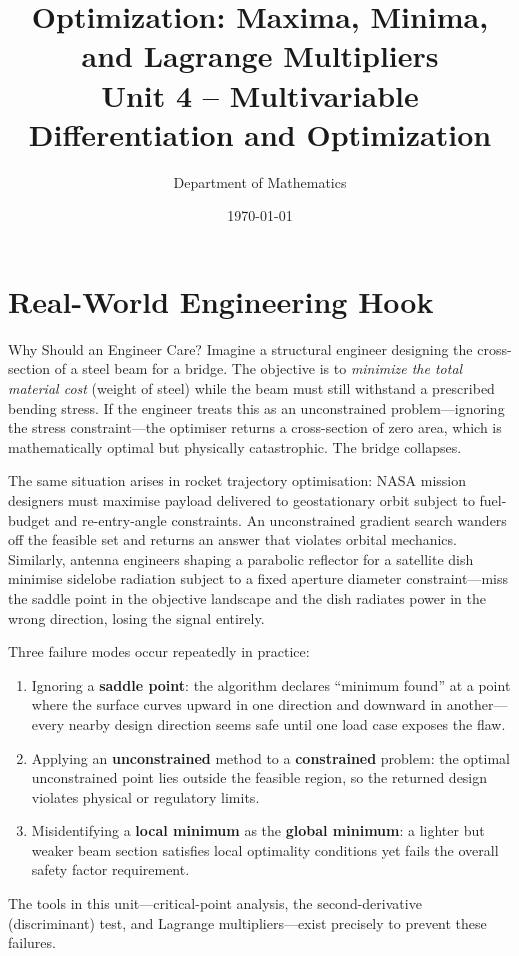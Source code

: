 \documentclass[12pt,a4paper]{article}
\title{\textbf{Optimization: Maxima, Minima, and Lagrange Multipliers} \\ \large Unit 4 -- Multivariable Differentiation and Optimization}
\author{Department of Mathematics}
\date{\today}
\begin{document}
\maketitle
\tableofcontents
\newpage

\section{Real-World Engineering Hook}

\begin{curiositybox}{Why Should an Engineer Care?}
Imagine a structural engineer designing the cross-section of a steel beam for a bridge. The objective is to \emph{minimize the total material cost} (weight of steel) while the beam must still withstand a prescribed bending stress. If the engineer treats this as an unconstrained problem---ignoring the stress constraint---the optimiser returns a cross-section of zero area, which is mathematically optimal but physically catastrophic. The bridge collapses.

The same situation arises in rocket trajectory optimisation: NASA mission designers must maximise payload delivered to geostationary orbit subject to fuel-budget and re-entry-angle constraints. An unconstrained gradient search wanders off the feasible set and returns an answer that violates orbital mechanics. Similarly, antenna engineers shaping a parabolic reflector for a satellite dish minimise sidelobe radiation subject to a fixed aperture diameter constraint---miss the saddle point in the objective landscape and the dish radiates power in the wrong direction, losing the signal entirely.

\medskip
Three failure modes occur repeatedly in practice:
\begin{enumerate}
  \item Ignoring a \textbf{saddle point}: the algorithm declares ``minimum found'' at a point where the surface curves upward in one direction and downward in another---every nearby design direction seems safe until one load case exposes the flaw.
  \item Applying an \textbf{unconstrained} method to a \textbf{constrained} problem: the optimal unconstrained point lies outside the feasible region, so the returned design violates physical or regulatory limits.
  \item Misidentifying a \textbf{local minimum} as the \textbf{global minimum}: a lighter but weaker beam section satisfies local optimality conditions yet fails the overall safety factor requirement.
\end{enumerate}

The tools in this unit---critical-point analysis, the second-derivative (discriminant) test, and Lagrange multipliers---exist precisely to prevent these failures.
\end{curiositybox}
\end{document}
